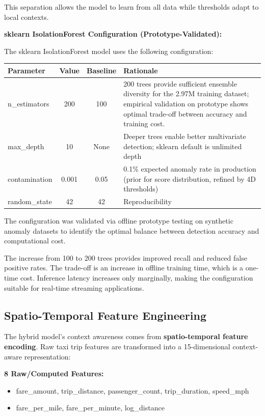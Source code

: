 This separation allows the model to learn from all data while thresholds adapt to local contexts.

\textbf{sklearn IsolationForest Configuration (Prototype-Validated):}

The sklearn IsolationForest model uses the following configuration:

\begin{center}
\begin{tabular}{|l|c|c|l|}
\hline
\textbf{Parameter} & \textbf{Value} & \textbf{Baseline} & \textbf{Rationale} \\
\hline
n\_estimators & 200 & 100 & 200 trees provide sufficient ensemble diversity for the 2.97M training dataset; empirical validation on prototype shows optimal trade-off between accuracy and training cost. \\
max\_depth & 10 & None & Deeper trees enable better multivariate detection; sklearn default is unlimited depth \\
contamination & 0.001 & 0.05 & 0.1\% expected anomaly rate in production (prior for score distribution, refined by 4D thresholds) \\
random\_state & 42 & 42 & Reproducibility \\
\hline
\end{tabular}
\end{center}

The configuration was validated via offline prototype testing on synthetic anomaly datasets to identify the optimal balance between detection accuracy and computational cost.

The increase from 100 to 200 trees provides improved recall and reduced false positive rates. The trade-off is an increase in offline training time, which is a one-time cost. Inference latency increases only marginally, making the configuration suitable for real-time streaming applications.

\subsection{Spatio-Temporal Feature Engineering}

The hybrid model's context awareness comes from \textbf{spatio-temporal feature encoding}. Raw taxi trip features are transformed into a 15-dimensional context-aware representation:

\textbf{8 Raw/Computed Features:}
\begin{itemize}
    \item fare\_amount, trip\_distance, passenger\_count, trip\_duration, speed\_mph
    \item fare\_per\_mile, fare\_per\_minute, log\_distance
\end{itemize}

